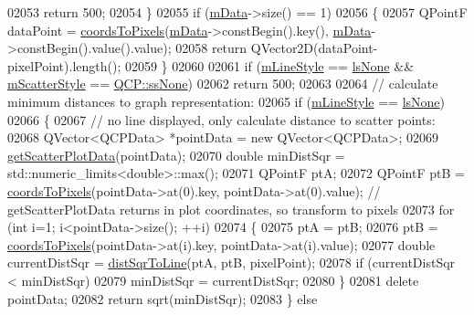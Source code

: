 \begin{DoxyCode}
02053     \textcolor{keywordflow}{return} 500;
02054   \}
02055   \textcolor{keywordflow}{if} (\hyperlink{a00031_a8457c840f69a0ac49f61d30a509c5d08}{mData}->size() == 1)
02056   \{
02057     QPointF dataPoint = \hyperlink{a00024_ade710a776104b14c1c835168ce1bfc5c}{coordsToPixels}(\hyperlink{a00031_a8457c840f69a0ac49f61d30a509c5d08}{mData}->constBegin().key(), 
      \hyperlink{a00031_a8457c840f69a0ac49f61d30a509c5d08}{mData}->constBegin().value().value);
02058     \textcolor{keywordflow}{return} QVector2D(dataPoint-pixelPoint).length();
02059   \}
02060   
02061   \textcolor{keywordflow}{if} (\hyperlink{a00031_a8604fd98402035a63375849f7341ee25}{mLineStyle} == \hyperlink{a00031_ad60175cd9b5cac937c5ee685c32c0859aea9591b933733cc7b20786b71e60fa04}{lsNone} && \hyperlink{a00031_a8f255af6fe1df09cedec73857ca0b344}{mScatterStyle} == 
      \hyperlink{a00143_af66d0711d42fe78d96c28abadc67f26fa3ee9f603bc4623e9b98011e8829aad1d}{QCP::ssNone})
02062     \textcolor{keywordflow}{return} 500;
02063   
02064   \textcolor{comment}{// calculate minimum distances to graph representation:}
02065   \textcolor{keywordflow}{if} (\hyperlink{a00031_a8604fd98402035a63375849f7341ee25}{mLineStyle} == \hyperlink{a00031_ad60175cd9b5cac937c5ee685c32c0859aea9591b933733cc7b20786b71e60fa04}{lsNone})
02066   \{
02067     \textcolor{comment}{// no line displayed, only calculate distance to scatter points:}
02068     QVector<QCPData> *pointData = \textcolor{keyword}{new} QVector<QCPData>;
02069     \hyperlink{a00031_a0899c4d6357aee19a3abff5897c3c8c5}{getScatterPlotData}(pointData);
02070     \textcolor{keywordtype}{double} minDistSqr = std::numeric\_limits<double>::max();
02071     QPointF ptA;
02072     QPointF ptB = \hyperlink{a00024_ade710a776104b14c1c835168ce1bfc5c}{coordsToPixels}(pointData->at(0).key, pointData->at(0).value); \textcolor{comment}{//
       getScatterPlotData returns in plot coordinates, so transform to pixels}
02073     \textcolor{keywordflow}{for} (\textcolor{keywordtype}{int} i=1; i<pointData->size(); ++i)
02074     \{
02075       ptA = ptB;
02076       ptB = \hyperlink{a00024_ade710a776104b14c1c835168ce1bfc5c}{coordsToPixels}(pointData->at(i).key, pointData->at(i).value);
02077       \textcolor{keywordtype}{double} currentDistSqr = \hyperlink{a00024_a5ea1cab44ca912dcdc96ed81ec5bed5d}{distSqrToLine}(ptA, ptB, pixelPoint);
02078       \textcolor{keywordflow}{if} (currentDistSqr < minDistSqr)
02079         minDistSqr = currentDistSqr;
02080     \}
02081     \textcolor{keyword}{delete} pointData;
02082     \textcolor{keywordflow}{return} sqrt(minDistSqr);
02083   \} \textcolor{keywordflow}{else}

\end{DoxyCode}
